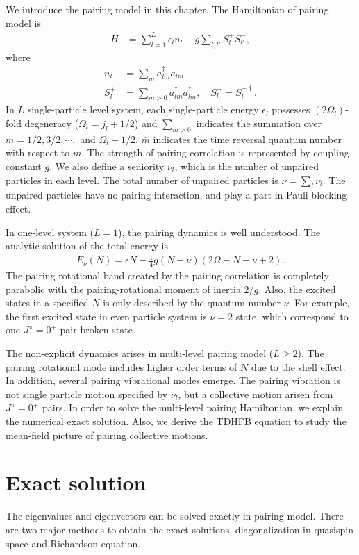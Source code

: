 \documentclass[11pt]{book} %
\begin{document}
We introduce the pairing model in this chapter. The Hamiltonian of pairing model is
\begin{align}
	H &= \sum_{l=1}^L \epsilon_l n_l - g \sum_{l,l'} S_l^+ S_{l'}^- ,
\end{align}
where
\begin{align}
	n_l &= \sum_m a^{\dag}_{lm}a_{lm} \\
        S_l^{+} &= \sum_{m>0}a_{lm}^{\dag}a_{l\overline{m}}^{\dag} ,
\quad   S_l^{-} = S_l^{+\dag} .
\label{S_+}
\end{align}
In $L$ single-particle level system, each single-particle energy $\epsilon_l$ possesses $(2\Omega_l)$-fold
degeneracy ($\Omega_l=j_l+1/2$)
and $\sum_{m>0}$ indicates the summation over $m=1/2,3/2,\cdots,$ and $\Omega_l-1/2$. $\overline{m}$ indicates the time reversal quantum number with respect to $m$. The strength of pairing correlation is represented by coupling constant $g$. We also define a seniority $\nu_l$, which is the number of unpaired particles in each level. The total number of unpaired particles is $\nu=\sum_l\nu_l$. The unpaired particles have no pairing interaction, and play a part in Pauli blocking effect.\par
In one-level system ($L=1$), the pairing dynamics is well understood. The analytic solution of the total energy is
\begin{align}
	E_{\nu}(N) = \epsilon N - \frac{1}{4}g(N-\nu)(2\Omega-N-\nu+2) .
	\label{onelevel}
\end{align}
The pairing rotational band created by the pairing correlation is completely parabolic with the pairing-rotational moment of inertia $2/g$. Also, the excited states in a specified $N$ is only described by the quantum number $\nu$. For example, the first excited state in even particle system is $\nu=2$ state, which correspond to one $J^{\pi}=0^+$ pair broken state.\par
The non-explicit dynamics arises in multi-level pairing model ($L\ge 2$). The pairing rotational mode includes higher order terms of $N$ due to the shell effect. In addition, several pairing vibrational modes emerge. The pairing vibration is not single particle motion specified by $\nu_l$, but a collective motion arisen from $J^{\pi}=0^+$ pairs. In order to solve the multi-level pairing Hamiltonian, we explain the numerical exact solution. Also, we derive the TDHFB equation to study the mean-field picture of pairing collective motions.

\section{Exact solution}
The eigenvalues and eigenvectors can be solved exactly in pairing model. There are two major methods to obtain the exact solutions, diagonalization in quasispin space and Richardson equation.
\end{document}

